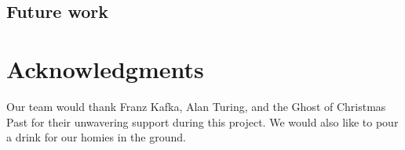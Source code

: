 \documentclass{aiaa-tc}%
\begin{document}
\subsection{Future work}

\section{Acknowledgments}
Our team would thank Franz Kafka, Alan Turing, and the Ghost of
Christmas Past for their unwavering support during this project. We
would also like to pour a drink for our homies in the ground.


% 

% 
\end{document}

